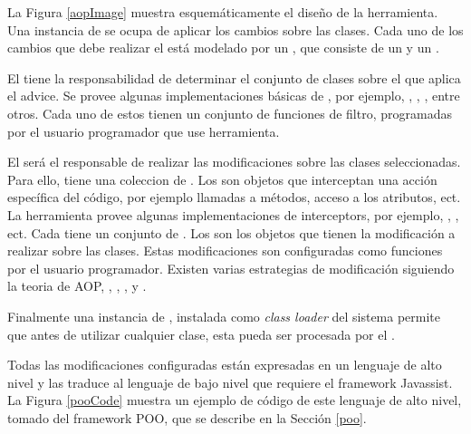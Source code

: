 	La Figura \ref{aopImage} muestra esquemáticamente el diseño de la herramienta.
	Una instancia de  se ocupa de aplicar los cambios sobre las
	clases.
	Cada uno de los cambios que debe realizar el  está
	modelado por un , que consiste de un  y un
	.
	
	El  tiene la responsabilidad de determinar el conjunto de
	clases sobre el que aplica el advice. Se provee algunas implementaciones básicas
	de , por ejemplo, , , 
	, entre otros. Cada uno de estos  tienen un conjunto de funciones
	de filtro, programadas por el usuario programador que use herramienta. 

	El  será el responsable de realizar las modificaciones 
	sobre las clases seleccionadas. Para ello, tiene una coleccion de .
 	Los   son objetos que interceptan una acción específica del código,  por ejemplo
 	llamadas a métodos, acceso a los atributos, ect. La herramienta provee algunas implementaciones de interceptors,
 	por ejemplo, , , ect. 
 	Cada  tiene un conjunto de .
 	Los  son los objetos que tienen la modificación a realizar sobre las clases. 
 	Estas modificaciones son configuradas como funciones por el usuario programador.
 	Existen varias estrategias de modificación siguiendo la teoria de AOP, , , ,  y . 
	 
	Finalmente una instancia de , instalada como \emph{class
	loader} del sistema permite que antes de utilizar cualquier clase, esta pueda
	ser procesada por el .
	
	Todas las modificaciones configuradas están expresadas en un
	lenguaje de alto nivel y las traduce al lenguaje de bajo nivel que requiere el
	framework Javassist.
	La Figura \ref{pooCode} muestra un ejemplo de código de este lenguaje de alto nivel,
	tomado del framework POO, que se describe en la Sección \ref{poo}.
	
